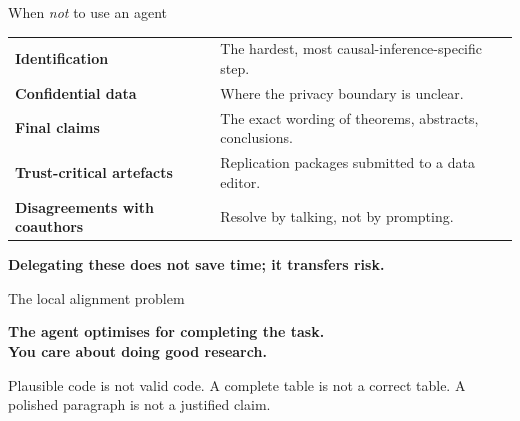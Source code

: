 \begin{frame}{When \emph{not} to use an agent}
  \vspace{0.2cm}
  \begin{center}
  \begin{tabularx}{0.92\linewidth}{>{\bfseries\color{deepblue}}lX}
  \toprule
  Identification & The hardest, most causal-inference-specific step.\\
  Confidential data & Where the privacy boundary is unclear.\\
  Final claims & The exact wording of theorems, abstracts, conclusions.\\
  Trust-critical artefacts & Replication packages submitted to a data editor.\\
  Disagreements with coauthors & Resolve by talking, not by prompting.\\
  \bottomrule
  \end{tabularx}
  \end{center}
  \vspace{0.4cm}
  \begin{center}\Large\color{accent}\bfseries Delegating these does not save time; it transfers risk.\end{center}
\end{frame}

\begin{frame}{The local alignment problem}
  \begin{center}\Large\bfseries\color{deepblue}The agent optimises for completing the task.\\You care about doing good research.\end{center}
  \vspace{0.4cm}
  \threebullets%
    {Plausible code is not valid code.}%
    {A complete table is not a correct table.}%
    {A polished paragraph is not a justified claim.}
  \vspace{0.5cm}
\end{frame}
